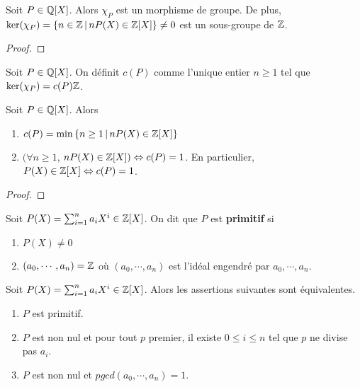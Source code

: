 \begin{proposition}
	Soit $P \in \mathbb{Q}[X]$. Alors $\chi_{P}$ est un morphisme de groupe. De
	plus, $\ker(\chi_{P}) = \left\{n \in \mathbb{Z} \, | \, n P(X) \in \mathbb{Z}[X] \right\}
	\neq 0$ est un sous-groupe de $\mathbb{Z}$.
\end{proposition}

\ifdefined\outputproof
\begin{proof}

\end{proof}
\fi

\begin{definition}
	Soit $P \in \mathbb{Q}[X]$. On définit $c(P)$ comme l'unique entier $n \geq
	1$ tel que $\ker(\chi_{P}) = c(P) \mathbb{Z}$.
\end{definition}

\begin{corollary}
	Soit $P \in \mathbb{Q}[X]$.
	Alors
	\begin{enumerate}
		\item $c(P) = \min \left\{n \geq 1 \, | \, n P(X) \in \mathbb{Z}[X] \right\}$
		\item $(\forall n \geq 1$, $n P(X) \in \mathbb{Z}[X]) \Leftrightarrow c(P) = 1$.
			En particulier, $P(X) \in \mathbb{Z}[X] \Leftrightarrow c(P) = 1$.
	\end{enumerate}
\end{corollary}

\ifdefined\outputproof
\begin{proof}

\end{proof}
\fi

\begin{definition} 
	Soit $P(X) = \sum_{i = 1}^{n} a_{i} X^{i} \in \mathbb{Z}[X]$. On dit que $P$
	est \textbf{primitif} si
	\begin{enumerate}
		\item $P(X) \neq 0$
		\item $(a_{0}, \cdots, a_{n}) = \mathbb{Z}$ où $(a_{0}, \cdots, a_{n})$
			est l'idéal engendré par $a_{0}, \cdots, a_{n}$.
	\end{enumerate}
\end{definition}

\begin{proposition}
	Soit $P(X) = \sum_{i = 1}^{n} a_{i} X^{i} \in \mathbb{Z}[X]$. Alors les
	assertions suivantes sont équivalentes.

	\begin{enumerate}
		\item $P$ est primitif.
		\item $P$ est non nul et pour tout $p$ premier, il existe $0 \leq i \leq
			n$ tel que $p$ ne divise pas $a_{i}$.
		\item $P$ est non nul et $pgcd(a_{0}, \cdots, a_{n}) = 1$.
	\end{enumerate}
\end{proposition}

